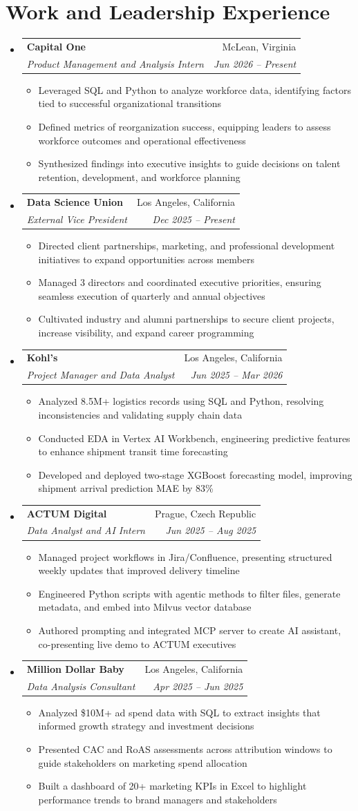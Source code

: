 \documentclass[letterpaper,11pt]{article}
\makeatletter
\newcommand{\resumeItem}[1]{
  \item\small{#1}
}
\newcommand{\resumeSubheading}[4]{
  \vspace{-2pt}\item
    \begin{tabular*}{\textwidth}[t]{l@{\extracolsep{\fill}}r}
      \textbf{#1} & #2 \\
      \textit{\small#3} & \textit{\small #4} \\
    \end{tabular*}\vspace{-7pt}
}
\newcommand{\resumeSubHeadingListStart}{\begin{itemize}[leftmargin=0in, label={}]}
\newcommand{\resumeSubHeadingListEnd}{\end{itemize}}
\newcommand{\resumeItemListStart}{\begin{itemize}[itemsep= 1.5pt, parsep=0pt]}
\newcommand{\resumeItemListEnd}{\end{itemize}\vspace{-5pt}}
\makeatother
\begin{document}
\section{Work and Leadership Experience}
  \resumeSubHeadingListStart
    \resumeSubheading
      {Capital One}{McLean, Virginia}
      {Product Management and Analysis Intern}{Jun 2026 -- Present}
      \resumeItemListStart
        \resumeItem{Leveraged SQL and Python to analyze workforce data, identifying factors tied to successful organizational transitions}
        \resumeItem{Defined metrics of reorganization success, equipping leaders to assess workforce outcomes and operational effectiveness}
        \resumeItem{Synthesized findings into executive insights to guide decisions on talent retention, development, and workforce planning}
      \resumeItemListEnd
    \resumeSubheading
      {Data Science Union}{Los Angeles, California}
      {External Vice President}{Dec 2025 -- Present}
      \resumeItemListStart
        \resumeItem{Directed client partnerships, marketing, and professional development initiatives to expand opportunities across members}
        \resumeItem{Managed 3 directors and coordinated executive priorities, ensuring seamless execution of quarterly and annual objectives}
        \resumeItem{Cultivated industry and alumni partnerships to secure client projects, increase visibility, and expand career programming}
      \resumeItemListEnd
    \resumeSubheading
      {Kohl's}{Los Angeles, California}
      {Project Manager and Data Analyst}{Jun 2025 -- Mar 2026}
      \resumeItemListStart
        \resumeItem{Analyzed 8.5M+ logistics records using SQL and Python, resolving inconsistencies and validating supply chain data}
        \resumeItem{Conducted EDA in Vertex AI Workbench, engineering predictive features to enhance shipment transit time forecasting}
        \resumeItem{Developed and deployed two-stage XGBoost forecasting model, improving shipment arrival prediction MAE by 83\%}
      \resumeItemListEnd
    \resumeSubheading
      {ACTUM Digital}{Prague, Czech Republic}
      {Data Analyst and AI Intern}{Jun 2025 -- Aug 2025}
      \resumeItemListStart
        \resumeItem{Managed project workflows in Jira/Confluence, presenting structured weekly updates that improved delivery timeline}
        \resumeItem{Engineered Python scripts with agentic methods to filter files, generate metadata, and embed into Milvus vector database}
        \resumeItem{Authored prompting and integrated MCP server to create AI assistant, co-presenting live demo to ACTUM executives}
      \resumeItemListEnd
    \resumeSubheading
      {Million Dollar Baby}{Los Angeles, California}
      {Data Analysis Consultant}{Apr 2025 -- Jun 2025}
      \resumeItemListStart
        \resumeItem{Analyzed \$10M+ ad spend data with SQL to extract insights that informed growth strategy and investment decisions}
        \resumeItem{Presented CAC and RoAS assessments across attribution windows to guide stakeholders on marketing spend allocation}
        \resumeItem{Built a dashboard of 20+ marketing KPIs in Excel to highlight performance trends to brand managers and stakeholders}
      \resumeItemListEnd
  \resumeSubHeadingListEnd
\end{document}
